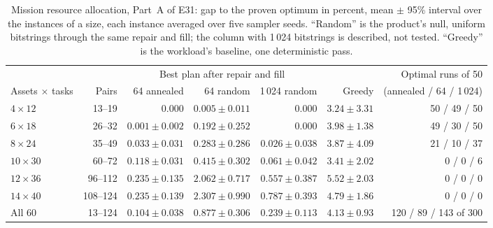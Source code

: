 \documentclass[11pt,a4paper]{article}
\begin{document}
\begin{table}[H]
\centering\footnotesize\setlength{\tabcolsep}{4pt}
\begin{tabular}{lrrrrrr}
\toprule
 & & \multicolumn{3}{c}{Best plan after repair and fill} & & Optimal runs of 50 \\
Assets $\times$ tasks & Pairs & 64 annealed & 64 random & 1\,024 random & Greedy & (annealed / 64 / 1\,024) \\
\midrule
$4 \times 12$ & 13--19 & $0.000$ & $0.005 \pm 0.011$ & $0.000$ & $3.24 \pm 3.31$ & 50 / 49 / 50 \\
$6 \times 18$ & 26--32 & $0.001 \pm 0.002$ & $0.192 \pm 0.252$ & $0.000$ & $3.98 \pm 1.38$ & 49 / 30 / 50 \\
$8 \times 24$ & 35--49 & $0.033 \pm 0.031$ & $0.283 \pm 0.286$ & $0.026 \pm 0.038$ & $3.87 \pm 4.09$ & 21 / 10 / 37 \\
$10 \times 30$ & 60--72 & $0.118 \pm 0.031$ & $0.415 \pm 0.302$ & $0.061 \pm 0.042$ & $3.41 \pm 2.02$ & 0 / 0 / 6 \\
$12 \times 36$ & 96--112 & $0.235 \pm 0.135$ & $2.062 \pm 0.717$ & $0.557 \pm 0.387$ & $5.52 \pm 2.03$ & 0 / 0 / 0 \\
$14 \times 40$ & 108--124 & $0.235 \pm 0.139$ & $2.307 \pm 0.990$ & $0.787 \pm 0.393$ & $4.79 \pm 1.86$ & 0 / 0 / 0 \\
\midrule
All 60 & 13--124 & $0.104 \pm 0.038$ & $0.877 \pm 0.306$ & $0.239 \pm 0.113$ & $4.13 \pm 0.93$ & 120 / 89 / 143 of 300 \\
\bottomrule
\end{tabular}
\caption{Mission resource allocation, Part~A of E31: gap to the proven
optimum in percent, mean $\pm$ 95\% interval over the instances of a size,
each instance averaged over five sampler seeds. ``Random'' is the product's
null, uniform bitstrings through the same repair and fill; the column with
1\,024 bitstrings is described, not tested. ``Greedy'' is the workload's
baseline, one deterministic pass.}
\label{tab:mission}
\end{table}
\end{document}
